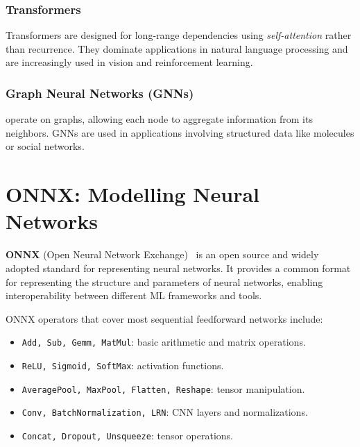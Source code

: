 \documentclass[oneside,11pt,dvipsnames]{book}
\numberwithin{equation}{section}
\theoremstyle{definition}
\theoremstyle{remark}
\begin{document}
\subsubsection{Transformers} Transformers are designed for long-range dependencies using \emph{self-attention} rather than recurrence. They dominate applications in natural language processing and are increasingly used in vision and reinforcement learning.

\subsubsection{Graph Neural Networks (GNNs)} operate on graphs, allowing each node to aggregate information from its neighbors. GNNs are used in applications involving structured data like molecules or social networks.



\section{ONNX: Modelling Neural Networks}\label{sec:onnx}

\textbf{ONNX} (Open Neural Network Exchange)~\cite{onnx} is an open source and widely adopted standard for representing neural networks. It provides a common format for representing the structure and parameters of neural networks, enabling interoperability between different ML frameworks and tools.



ONNX operators that cover most sequential feedforward networks include: 
\begin{itemize}
    \item \texttt{Add, Sub, Gemm, MatMul}: basic arithmetic and matrix operations.
    \item \texttt{ReLU, Sigmoid, SoftMax}: activation functions.
    \item \texttt{AveragePool, MaxPool, Flatten, Reshape}: tensor manipulation.
    \item \texttt{Conv, BatchNormalization, LRN}: CNN layers and normalizations.
    \item \texttt{Concat, Dropout, Unsqueeze}: tensor operations.
\end{itemize}
\end{document}

